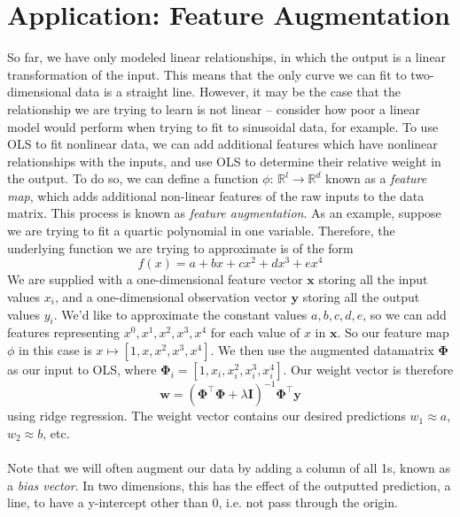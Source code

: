 \documentclass{article}
\begin{document}
\section*{Application: Feature Augmentation}
So far, we have only modeled linear relationships, in which the output is a linear transformation of the input. This means that the only curve we can fit to two-dimensional data is a straight line. However, it may be the case that the relationship we are trying to learn is not linear -- consider how poor a linear model would perform when trying to fit to sinusoidal data, for example. To use OLS to fit nonlinear data, we can add additional features which have nonlinear relationships with the inputs, and use OLS to determine their relative weight in the output. To do so, we can define a function $\phi$: $\mathbb{R}^l \rightarrow \mathbb{R}^d$ known as a \textit{feature map}, which adds additional non-linear features of the raw inputs to the data matrix. This process is known as \textit{feature augmentation}. As an example, suppose we are trying to fit a quartic polynomial in one variable. Therefore, the underlying function we are trying to approximate is of the form $$f(x) = a + bx + cx^2 + dx^3 + ex^4$$ We are supplied with a one-dimensional feature vector $\mathbf{x}$ storing all the input values $x_i$, and a one-dimensional observation vector $\mathbf{y}$ storing all the output values $y_i$. We'd like to approximate the constant values $a, b, c, d, e$, so we can add features representing $x^0, x^1, x^2, x^3, x^4$ for each value of $x$ in $\mathbf{x}$. So our feature map $\phi$ in this case is $x \mapsto [1, x, x^2, x^3, x^4]$. We then use the augmented datamatrix $\mathbf{\Phi}$ as our input to OLS, where $\mathbf{\Phi}_i = [1, x_i, x_i^2, x_i^3, x_i^4]$. Our weight vector is therefore $$\mathbf{w} = (\mathbf{\Phi^{\top}\Phi} + \lambda\mathbf{I})^{-1}\mathbf{\Phi^{\top}y}$$ using ridge regression. The weight vector contains our desired predictions $w_1 \approx a$, $w_2 \approx b$, etc. \\\\
Note that we will often augment our data by adding a column of all 1s, known as a \textit{bias vector}. In two dimensions, this has the effect of the outputted prediction, a line, to have a y-intercept other than 0, i.e. not pass through the origin.

\clearpage
\end{document}
